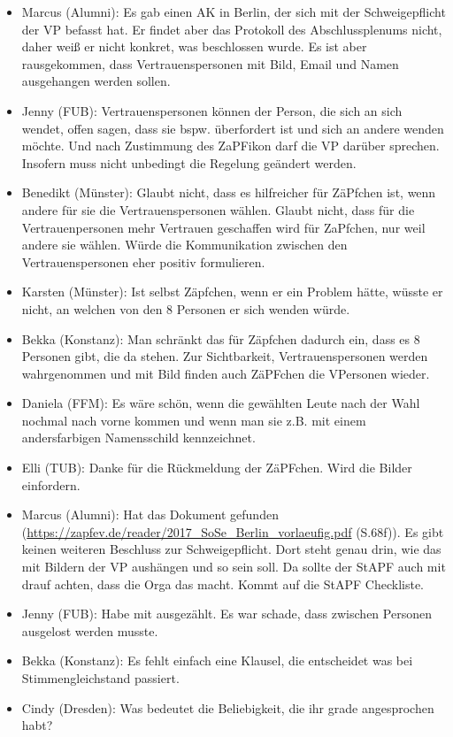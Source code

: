 \begin{itemize}
        \item Marcus (Alumni): Es gab einen AK in Berlin, der sich mit der Schweigepflicht der VP befasst hat. Er findet aber das Protokoll des Abschlussplenums nicht, daher weiß er nicht konkret, was beschlossen wurde. Es ist aber rausgekommen, dass Vertrauenspersonen mit Bild, Email und Namen ausgehangen werden sollen.
        \item Jenny (FUB): Vertrauenspersonen können der Person, die sich an sich wendet, offen sagen, dass sie bspw. überfordert ist und sich an andere wenden möchte. Und nach Zustimmung des ZaPFikon darf die VP darüber sprechen. Insofern muss nicht unbedingt die Regelung geändert werden.
        \item Benedikt (Münster): Glaubt nicht, dass es hilfreicher für ZäPfchen ist, wenn andere für sie die Vertrauenspersonen wählen. Glaubt nicht, dass für die Vertrauenpersonen mehr Vertrauen geschaffen wird für ZaPfchen, nur weil andere sie wählen. Würde die Kommunikation zwischen den Vertrauenspersonen eher positiv formulieren.
        \item Karsten (Münster): Ist selbst Zäpfchen, wenn er ein Problem hätte, wüsste er nicht, an welchen von den 8 Personen er sich wenden würde.
        \item Bekka (Konstanz): Man schränkt das für Zäpfchen dadurch ein, dass es 8 Personen gibt, die da stehen. Zur Sichtbarkeit, Vertrauenspersonen werden wahrgenommen und mit Bild finden auch ZäPFchen die VPersonen wieder.
        \item Daniela (FFM): Es wäre schön, wenn die gewählten Leute nach der Wahl nochmal nach vorne kommen und wenn man sie z.B. mit einem andersfarbigen Namensschild kennzeichnet.
        \item Elli (TUB): Danke für die Rückmeldung der ZäPFchen. Wird die Bilder einfordern.
        \item Marcus (Alumni): Hat das Dokument gefunden (\url{https://zapfev.de/reader/2017_SoSe_Berlin_vorlaeufig.pdf} (S.68f)). Es gibt keinen weiteren Beschluss zur Schweigepflicht. Dort steht genau drin, wie das mit Bildern der VP aushängen und so sein soll. Da sollte der StAPF auch mit drauf achten, dass die Orga das macht. Kommt auf die StAPF Checkliste.
        \item Jenny (FUB): Habe mit ausgezählt. Es war schade, dass zwischen Personen ausgelost werden musste.
        \item Bekka (Konstanz): Es fehlt einfach eine Klausel, die entscheidet was bei Stimmengleichstand passiert.
        \item Cindy (Dresden): Was bedeutet die Beliebigkeit, die ihr grade angesprochen habt?

\end{itemize}
